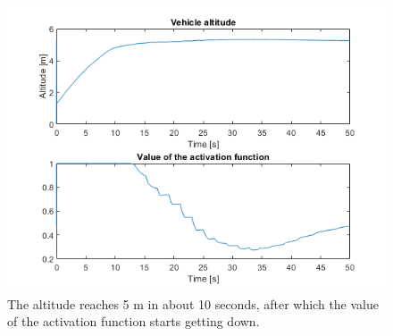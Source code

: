 \documentclass{article}
\begin{document}
\begin{figure}[H]
	\centering
	\includegraphics[scale=0.55]{images/Ex1/SafeNavigation_5m_AltAndActFunct}
	\caption{The altitude reaches 5 m in about 10 seconds, after which the value of the activation function starts getting down.}
	\label{fig:ex1.2.3_case5m_c}
\end{figure}
\end{document}
